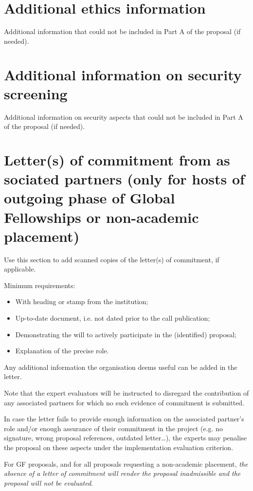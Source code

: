 \documentclass[11pt,draftproposal]{msca-pf-2022}
\begin{document}
\section{Additional ethics information}

Additional information that could not be included in Part A of the proposal (if needed).

\section{Additional information on security screening}

Additional information on security aspects that could not be included in Part
A of the proposal (if needed).

\section{Letter(s) of commitment from as
    sociated partners (only for hosts of
    outgoing phase of Global Fellowships or non-academic placement)}

Use this section to add scanned copies of the letter(s) of commitment, if applicable.

Minimum requirements:

\begin{itemize}
    \item With heading or stamp from the institution;
    \item Up-to-date document, i.e. not dated prior to the call publication;
    \item Demonstrating the will to actively participate in the (identified) proposal;
    \item Explanation of the precise role.
\end{itemize}

Any additional information the organisation deems useful can be added in the letter.

Note that the expert evaluators will be instructed to disregard the contribution
of any associated partners for which no such evidence of commitment is submitted.

In case the letter fails to provide enough information on the associated partner's
role and/or enough assurance of their commitment in the project (e.g. no signature,
wrong proposal references, outdated letter…), the experts may penalise the
proposal on these aspects under the implementation evaluation criterion.

For GF proposals, and for all proposals requesting a non-academic placement,
\emph{the absence of a letter of commitment will render the proposal inadmissible
and the proposal will not be evaluated}.
\end{document}
